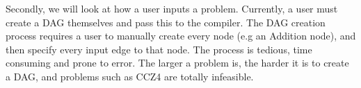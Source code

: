 Secondly, we will look at how a user inputs a problem.
Currently, a user must create a DAG themselves and pass this to the compiler.
The DAG creation process requires a user to manually create every node (e.g an Addition node), and then specify every input edge to that node.
The process is tedious, time consuming and prone to error.
The larger a problem is, the harder it is to create a DAG, and problems such as CCZ4 are totally infeasible.
